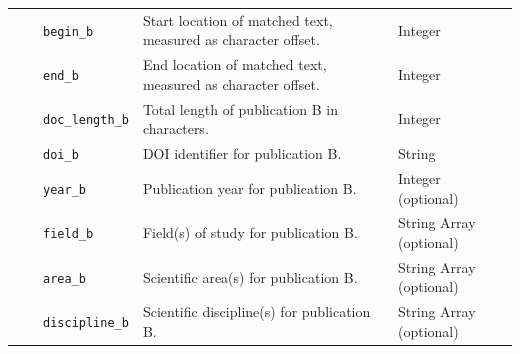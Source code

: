 \begin{table}[ht]
\begin{tabularx}{\textwidth}{@{}cclXl@{}}
\midrule
\parbox[t]{0.7em}{}

& \parbox[t]{0.7em}{}
& \texttt{begin\_b} & Start location of matched text, measured as character offset.& Integer\\
& & \texttt{end\_b} & End location of matched text, measured as character offset.& Integer\\
& & \texttt{doc\_length\_b} & Total length of publication B in characters. & Integer\\

\cmidrule(l){2-5}
& \parbox[t]{0.7em}{}
& \texttt{doi\_b} & DOI identifier for publication B.& String\\
& & \texttt{year\_b} & Publication year for publication B.& Integer (optional)\\
& & \texttt{field\_b} & Field(s) of study for publication B.& String Array (optional)\\
& & \texttt{area\_b} & Scientific area(s) for publication B. & String Array (optional)\\
& & \texttt{discipline\_b} & Scientific discipline(s) for publication B.& String Array (optional)\\[1.0ex]

\bottomrule
\end{tabularx}

\end{table}
